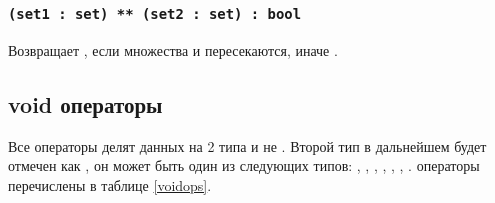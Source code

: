 \subsubsection{\lstinline|(set1 : set) ** (set2 : set) : bool|}

Возвращает \true, если множества  и  пересекаются, иначе \false.

\subsection{{\color{lightblue}void} операторы}

Все \void{} операторы делят данных на 2 типа \void{} и не \void{}. Второй тип в дальнейшем будет отмечен как , он может быть один из следующих типов: \integer{}, \double{}, \str{}, \listtype{}, \object{}, \set{}, \element{}. \void{} операторы перечислены в таблице \ref{voidops}.

